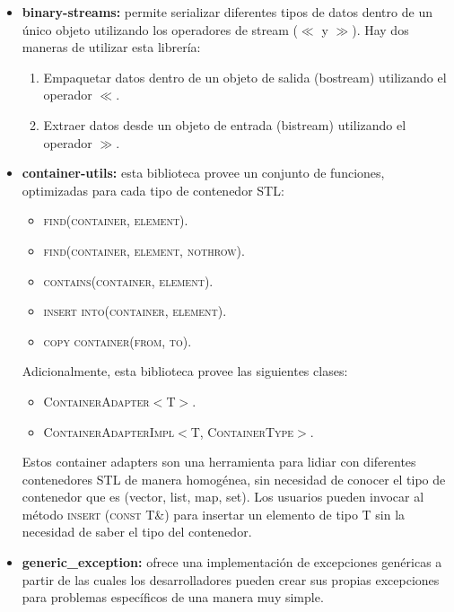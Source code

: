 \documentclass[12pt,a4paper,spanish]{article}
\begin{document}
		\begin{itemize}
			\item \textbf{binary-streams:} permite serializar diferentes tipos de datos dentro de un único objeto 				utilizando los operadores de stream ($\ll$ y $\gg$). Hay dos maneras de utilizar esta librería:
			\begin{enumerate}
				\item Empaquetar datos dentro de un objeto de salida (bostream) utilizando el operador $\ll$.	
				\item Extraer datos desde un objeto de entrada (bistream) utilizando el operador $\gg$.
			\end{enumerate}
			\item \textbf{container-utils:} esta biblioteca provee un conjunto de funciones, optimizadas para cada tipo de 					contenedor STL:
				\begin{itemize}
					\item \textsc{find(container, element)}.
					\item \textsc{find(container, element, nothrow)}.
					\item \textsc{contains(container, element)}.
					\item \textsc{insert into(container, element)}.
					\item \textsc{copy container(from, to)}.
				\end{itemize}
		\par Adicionalmente, esta biblioteca provee las siguientes clases:
			\begin{itemize}
				\item \textsc{ContainerAdapter$<$T$>$}.
				\item \textsc{ContainerAdapterImpl$<$T, ContainerType$>$}.
			\end{itemize}
		\par Estos container adapters son una herramienta para lidiar con diferentes contenedores \textsc{STL} de manera 			homogénea, sin necesidad de conocer el tipo de contenedor que es (vector, list, map, set). Los usuarios pueden 			invocar al método \textsc{insert (const T\&)} para insertar un elemento de tipo \textsc{T} sin la necesidad de 			saber el tipo del contenedor.

		\item \textbf{generic\_exception:} ofrece una implementación de excepciones genéricas a partir de las cuales los 			desarrolladores pueden crear sus propias excepciones para problemas específicos de una manera muy simple.
	\end{itemize}
		
\end{document}
